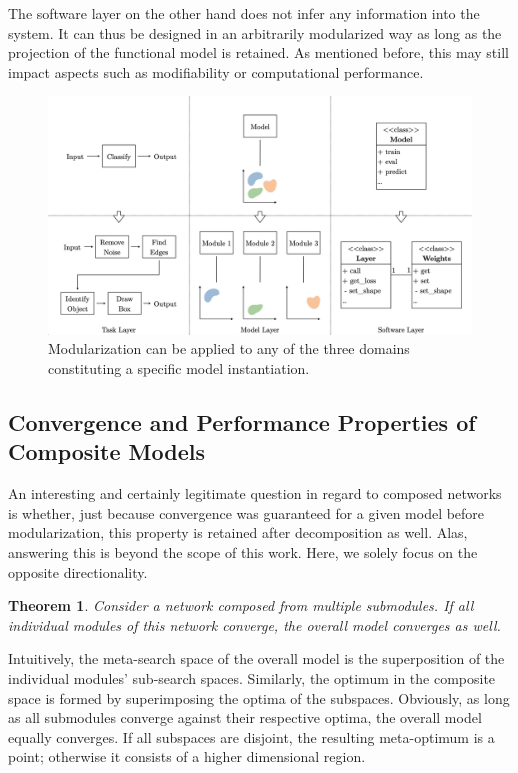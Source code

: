 The software layer on the other hand does not infer any information into the system. It can thus be designed in an arbitrarily modularized way as long as the projection of the functional model is retained. As mentioned before, this may still impact aspects such as modifiability or computational performance.

\begin{figure}[tb]
    \centering
	    \includegraphics[width=\textwidth, trim=0 -25 0 -25, clip]{thesis/graphics/graphics/modularization_domains.jpeg}
    \caption{Modularization can be applied to any of the three domains constituting a specific model instantiation.}
    \label{fig:compnet_modularization_modularization_domains}
\end{figure}

\subsection{Convergence and Performance Properties of Composite Models%
            \label{sec:compnet_modularization_convergence_performance}}
            
An interesting and certainly legitimate question in regard to composed networks is whether, just because convergence was guaranteed for a given model before modularization, this property is retained after decomposition as well. Alas, answering this is beyond the scope of this work. Here, we solely focus on the opposite directionality.

\newtheorem{theorem}{Theorem}
\begin{theorem}
    Consider a network composed from multiple submodules. If all individual modules of this network converge, the overall model converges as well.
\end{theorem}

Intuitively, the meta-search space of the overall model is the superposition of the individual modules' sub-search spaces. Similarly, the optimum in the composite space is formed by superimposing the optima of the subspaces. Obviously, as long as all submodules converge against their respective optima, the overall model equally converges. If all subspaces are disjoint, the resulting meta-optimum is a point; otherwise it consists of a higher dimensional region.

